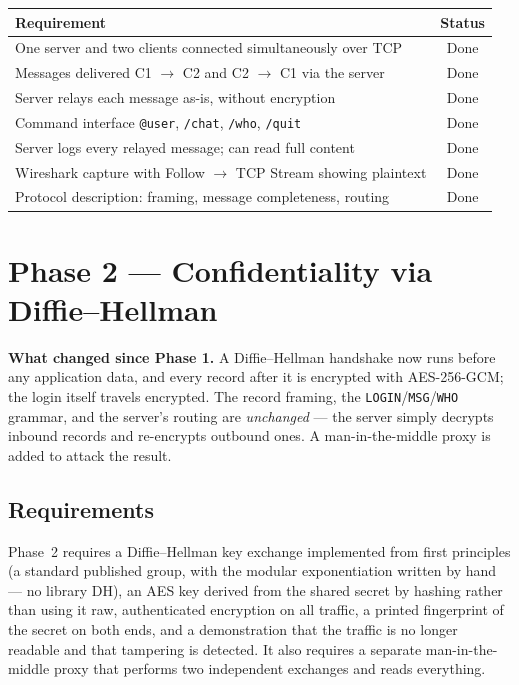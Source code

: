 \documentclass[11pt,a4paper]{article}
\begin{document}
\begin{center}
\small
\begin{tabular}{@{}lc@{}}
\toprule
\textbf{Requirement} & \textbf{Status} \\
\midrule
One server and two clients connected simultaneously over TCP & Done \\
Messages delivered C1 $\rightarrow$ C2 and C2 $\rightarrow$ C1 via the server & Done \\
Server relays each message as-is, without encryption & Done \\
Command interface \texttt{@user}, \texttt{/chat}, \texttt{/who}, \texttt{/quit} & Done \\
Server logs every relayed message; can read full content & Done \\
Wireshark capture with Follow $\rightarrow$ TCP Stream showing plaintext & Done \\
Protocol description: framing, message completeness, routing & Done \\
\bottomrule
\end{tabular}
\end{center}

\section{Phase 2 --- Confidentiality via Diffie--Hellman}

\begin{keybox}
\textbf{What changed since Phase 1.} A Diffie--Hellman handshake now runs before any application data,
and every record after it is encrypted with AES-256-GCM; the login itself travels encrypted. The
record framing, the \texttt{LOGIN}/\texttt{MSG}/\texttt{WHO} grammar, and the server's routing are
\emph{unchanged} --- the server simply decrypts inbound records and re-encrypts outbound ones. A
man-in-the-middle proxy is added to attack the result.
\end{keybox}

\subsection{Requirements}

Phase~2 requires a Diffie--Hellman key exchange implemented from first principles (a standard
published group, with the modular exponentiation written by hand --- no library DH), an AES key
derived from the shared secret by hashing rather than using it raw, authenticated encryption on all
traffic, a printed fingerprint of the secret on both ends, and a demonstration that the traffic is no
longer readable and that tampering is detected. It also requires a separate man-in-the-middle proxy
that performs two independent exchanges and reads everything.
\end{document}
